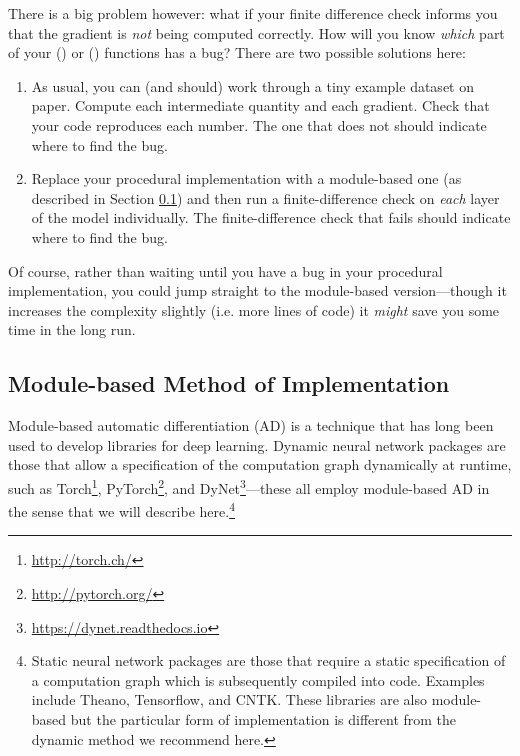 \documentclass[11pt,addpoints,answers]{exam}
\begin{document}
There is a big problem however: what if your finite difference check informs you that the gradient is \emph{not} being computed correctly. How will you know \emph{which} part of your () or () functions has a bug? There are two possible solutions here:
\begin{enumerate}
    \item As usual, you can (and should) work through a tiny example dataset on paper. Compute each intermediate quantity and each gradient. Check that your code reproduces each number. The one that does not should indicate where to find the bug.
    \item Replace your procedural implementation with a module-based one (as described in Section \ref{sec:modulebased}) and then run a finite-difference check on \emph{each} layer of the model individually. The finite-difference check that fails should indicate where to find the bug.
\end{enumerate}

Of course, rather than waiting until you have a bug in your procedural implementation, you could jump straight to the module-based version---though it increases the complexity slightly (i.e. more lines of code) it \emph{might} save you some time in the long run.

\subsection{Module-based Method of Implementation}
\label{sec:modulebased}

Module-based automatic differentiation (AD) is a technique that has long been used to develop libraries for deep learning. Dynamic neural network packages are those that allow a specification of the computation graph dynamically at runtime, such as Torch\footnote{\url{http://torch.ch/}}, PyTorch\footnote{\url{http://pytorch.org/}}, and DyNet\footnote{\url{https://dynet.readthedocs.io}}---these all employ module-based AD in the sense that we will describe here.\footnote{Static neural network packages are those that require a static specification of a computation graph which is subsequently compiled into code. Examples include Theano, Tensorflow, and CNTK. These libraries are also module-based but the particular form of implementation is different from the dynamic method we recommend here.}
\end{document}
